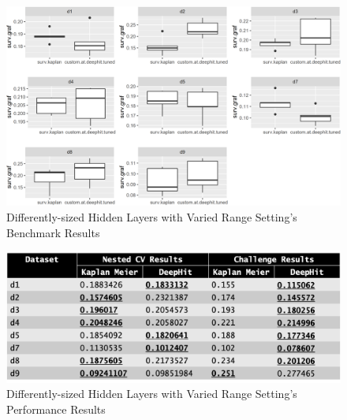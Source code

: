 \documentclass[
]{article}
\begin{document}
\begin{figure}

{\centering \includegraphics[width=0.8\linewidth]{differently-sized-hidden-layers-w-varied-range-nested-cv-boxplots} 

}

\caption{Differently-sized Hidden Layers with Varied Range Setting's Benchmark Results}\label{fig:differently-sized-hidden-layers-w-varied-range-nested-cv-boxplots}
\end{figure}

\begin{figure}

{\centering \includegraphics[width=0.8\linewidth]{differently-sized-hidden-layers-w-varied-range-results} 

}

\caption{Differently-sized Hidden Layers with Varied Range Setting's Performance Results}\label{fig:differently-sized-hidden-layers-w-varied-range-results}
\end{figure}
\end{document}
